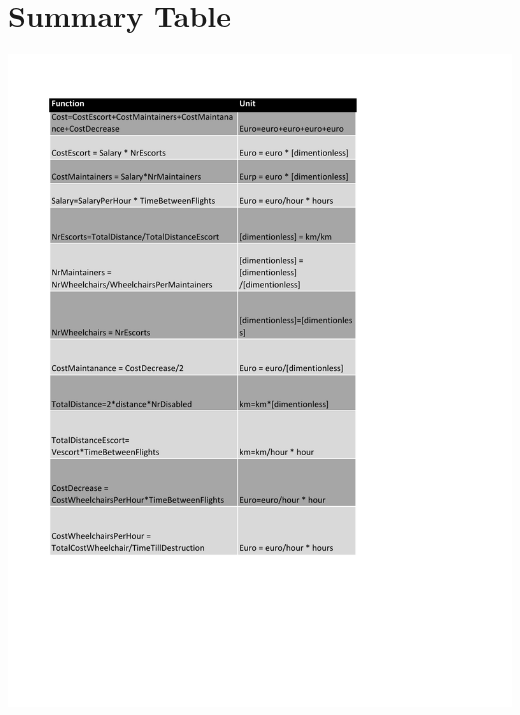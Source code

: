 \documentclass[a4paper, 11pt, notitlepage]{report}
\begin{document}
	\section{Summary Table}
	\includegraphics[scale=0.8]{Table1.pdf}
\end{document}

